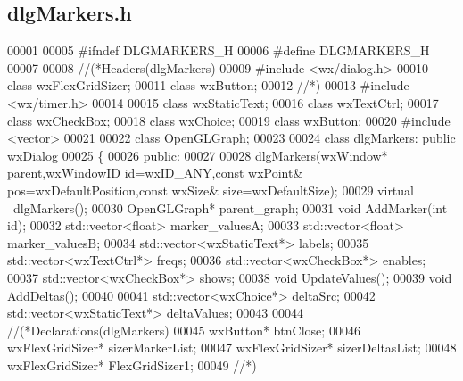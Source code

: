\subsection{dlg\+Markers.\+h}
\label{dlgMarkers_8h_source}

\begin{DoxyCode}
00001 
00005 \textcolor{preprocessor}{#ifndef DLGMARKERS\_H}
00006 \textcolor{preprocessor}{#define DLGMARKERS\_H}
00007 
00008 \textcolor{comment}{//(*Headers(dlgMarkers)}
00009 \textcolor{preprocessor}{#include <wx/dialog.h>}
00010 \textcolor{keyword}{class }wxFlexGridSizer;
00011 \textcolor{keyword}{class }wxButton;
00012 \textcolor{comment}{//*)}
00013 \textcolor{preprocessor}{#include <wx/timer.h>}
00014 
00015 \textcolor{keyword}{class }wxStaticText;
00016 \textcolor{keyword}{class }wxTextCtrl;
00017 \textcolor{keyword}{class }wxCheckBox;
00018 \textcolor{keyword}{class }wxChoice;
00019 \textcolor{keyword}{class }wxButton;
00020 \textcolor{preprocessor}{#include <vector>}
00021 
00022 \textcolor{keyword}{class }OpenGLGraph;
00023 
00024 \textcolor{keyword}{class }dlgMarkers: \textcolor{keyword}{public} wxDialog
00025 \{
00026     \textcolor{keyword}{public}:
00027 
00028         dlgMarkers(wxWindow* parent,wxWindowID \textcolor{keywordtype}{id}=wxID\_ANY,\textcolor{keyword}{const} wxPoint& pos=wxDefaultPosition,\textcolor{keyword}{const} 
      wxSize& size=wxDefaultSize);
00029         \textcolor{keyword}{virtual} ~dlgMarkers();
00030                 OpenGLGraph* parent_graph;
00031         \textcolor{keywordtype}{void} AddMarker(\textcolor{keywordtype}{int} \textcolor{keywordtype}{id});
00032         std::vector<float> marker_valuesA;
00033                 std::vector<float> marker_valuesB;
00034         std::vector<wxStaticText*> labels;
00035         std::vector<wxTextCtrl*> freqs;
00036         std::vector<wxCheckBox*> enables;
00037         std::vector<wxCheckBox*> shows;
00038         \textcolor{keywordtype}{void} UpdateValues();
00039         \textcolor{keywordtype}{void} AddDeltas();
00040 
00041         std::vector<wxChoice*> deltaSrc;
00042         std::vector<wxStaticText*> deltaValues;
00043 
00044         \textcolor{comment}{//(*Declarations(dlgMarkers)}
00045         wxButton* btnClose;
00046         wxFlexGridSizer* sizerMarkerList;
00047         wxFlexGridSizer* sizerDeltasList;
00048         wxFlexGridSizer* FlexGridSizer1;
00049         \textcolor{comment}{//*)}

\end{DoxyCode}
